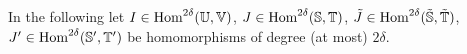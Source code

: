 %
%


In the following let $I\in\text{Hom}^{2\delta}(\mathbb{U}, \mathbb{V})$, $J\in\text{Hom}^{2\delta}(\mathbb{S},\mathbb{T})$, $\tilde{J}\in\text{Hom}^{2\delta}(\tilde{\mathbb{S}},\tilde{\mathbb{T}})$, $J'\in\text{Hom}^{2\delta}(\mathbb{S}',\mathbb{T}')$ be homomorphisms of degree (at most) $2\delta$.

%


